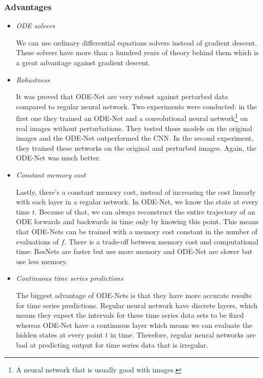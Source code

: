\documentclass[10pt,a4paper]{article}
\theoremstyle{definition}
\theoremstyle{plain}
\begin{document}
\subsubsection*{Advantages}
\begin{itemize}
\item \textit{ODE solvers}

We can use ordinary differential equations solvers instead of gradient descent. These solvers have more than a hundred years of theory behind them which is a great advantage against gradient descent.

\item \textit{Robustness} \cite{4}

It was proved that ODE-Net are very robust against perturbed data compared to regular neural network. Two experiments were conducted: in the first one they trained an ODE-Net and a convolutional neural network\footnote{A neural network that is usually good with images.} on real images without perturbations. They tested these models on the original images and the ODE-Net outperformed the CNN. In the second experiment, they trained these networks on the original and perturbed images. Again, the ODE-Net was much better.

\item \textit{Constant memory cost}

Lastly, there's a constant memory cost, instead of increasing the cost linearly with each layer in a regular network. 
In ODE-Net, we know the state at every time $t$. Because of that, we can always reconstruct the entire trajectory of an ODE forwards and backwards in time only by knowing this point. This means that ODE-Nets can be trained with a memory cost constant in the number of evaluations of $f$.
There is a trade-off between memory cost and computational time: ResNets are faster but use more memory and ODE-Net are slower but use less memory.

\item \textit{Continuous time series predictions}

The biggest advantage of ODE-Nets is that they have more accurate results for time series predictions. Regular neural network have discrete layers, which means they expect the intervals for these time series data sets to be fixed whereas ODE-Net have a continuous layer which means we can evaluate the hidden states at every point $t$ in time. Therefore, regular neural networks are bad at predicting output for time series data that is irregular.
\end{itemize}
\end{document}
